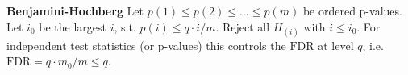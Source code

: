 \textbf{Benjamini-Hochberg}
Let $p(1)\leq p(2) \leq ... \leq p(m)$ be ordered p-values. Let $i_0$ be the largest $i$, s.t. $p(i)\leq q\cdot i / m$. Reject all $H_{(i)}$ with $i\leq i_0$. For independent test statistics (or p-values) this controls the $\text{FDR}$ at level $q$, i.e. $\text{FDR}=q\cdot m_0 / m \leq q$.